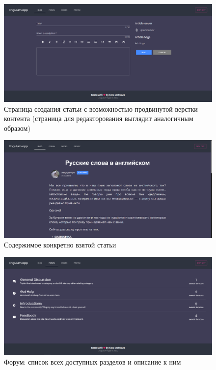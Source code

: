 \begin{figure}[h]
	\centering
	\includegraphics[width=\textwidth]{figures/createlist}
	\caption{Страница создания статьи с возможностью продвинутой верстки контента (страница для редакторования выглядит аналогичным образом)}
	\label{fig:createlist}
\end{figure}

\begin{figure}[h]
	\centering
	\includegraphics[width=\textwidth]{figures/articleitem}
	\caption{Содержимое конкретно взятой статьи}
	\label{fig:articleitem}
\end{figure}

\begin{figure}[h]
	\centering
	\includegraphics[width=\textwidth]{figures/forumlist}
	\caption{Форум: список всех доступных разделов и описание к ним}
	\label{fig:forumlist}
\end{figure}

